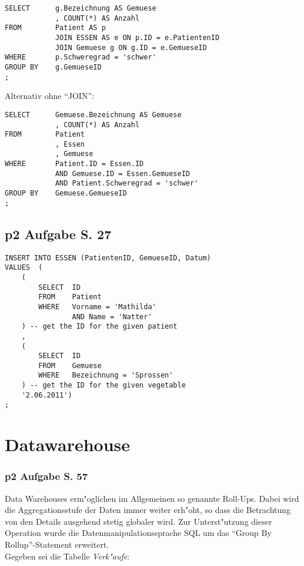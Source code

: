 \lstset{style=customSQL}
\begin{lstlisting}
SELECT      g.Bezeichnung AS Gemuese
            , COUNT(*) AS Anzahl
FROM        Patient AS p
            JOIN ESSEN AS e ON p.ID = e.PatientenID
            JOIN Gemuese g ON g.ID = e.GemueseID
WHERE       p.Schweregrad = 'schwer'
GROUP BY    g.GemueseID
;
\end{lstlisting}
Alternativ ohne "`JOIN"':
\lstset{style=customSQL}
\begin{lstlisting}
SELECT      Gemuese.Bezeichnung AS Gemuese
            , COUNT(*) AS Anzahl
FROM        Patient
            , Essen
            , Gemuese
WHERE       Patient.ID = Essen.ID
            AND Gemuese.ID = Essen.GemueseID
            AND Patient.Schweregrad = 'schwer'
GROUP BY    Gemuese.GemueseID
;
\end{lstlisting}

\subsection{p2 Aufgabe S. 27}

\lstset{style=customSQL}
\begin{lstlisting}
INSERT INTO ESSEN (PatientenID, GemueseID, Datum)
VALUES  (
    (
        SELECT  ID
        FROM    Patient
        WHERE   Vorname = 'Mathilda'
                AND Name = 'Natter'
    ) -- get the ID for the given patient
    ,
    (
        SELECT  ID
        FROM    Gemuese
        WHERE   Bezeichnung = 'Sprossen'
    ) -- get the ID for the given vegetable
    '2.06.2011')
;
\end{lstlisting}


\section{Datawarehouse}

\subsubsection{p2 Aufgabe S. 57}
Data Warehouses erm"oglichen im Allgemeinen so genannte Roll-Ups.
Dabei wird die Aggregationsstufe der Daten immer weiter erh"oht, so dass die Betrachtung von den Details ausgehend stetig globaler wird.
Zur Unterst"utzung dieser Operation wurde die Datenmanipulationssprache SQL um das "`Group By Rollup"'-Statement erweitert.\\\noindent
Gegeben sei die Tabelle \textit{Verk"aufe}:\\

